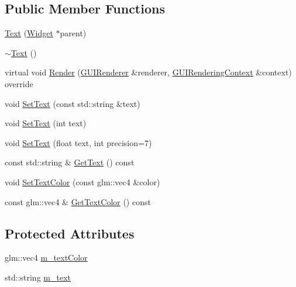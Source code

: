 \subsection*{Public Member Functions}
\begin{DoxyCompactItemize}
\item 
\mbox{\hyperlink{classngl__gui_1_1_text_aef88dfbef08883a239cafcb418367564}{Text}} (\mbox{\hyperlink{classngl__gui_1_1_widget}{Widget}} $\ast$parent)
\item 
\mbox{\hyperlink{classngl__gui_1_1_text_a844f8f7ab019695c03e3a4d834394c51}{$\sim$\+Text}} ()
\item 
virtual void \mbox{\hyperlink{classngl__gui_1_1_text_aa2dbe996a42ec05d5027ff972028ddf4}{Render}} (\mbox{\hyperlink{classngl__gui_1_1_g_u_i_renderer}{G\+U\+I\+Renderer}} \&renderer, \mbox{\hyperlink{classngl__gui_1_1_g_u_i_rendering_context}{G\+U\+I\+Rendering\+Context}} \&context) override
\item 
void \mbox{\hyperlink{classngl__gui_1_1_text_a1b0f380ffc9f3a662a10f66555e18762}{Set\+Text}} (const std\+::string \&text)
\item 
void \mbox{\hyperlink{classngl__gui_1_1_text_af359415192988ac80b0aad216eaeb661}{Set\+Text}} (int text)
\item 
void \mbox{\hyperlink{classngl__gui_1_1_text_a0e1b2e9696c84cfd54d8141809bdc032}{Set\+Text}} (float text, int precision=7)
\item 
const std\+::string \& \mbox{\hyperlink{classngl__gui_1_1_text_ab31e4a3d86b1b00122cf831c53cfe456}{Get\+Text}} () const
\item 
void \mbox{\hyperlink{classngl__gui_1_1_text_a25b6ad0a6f6b678c0851bed62479d571}{Set\+Text\+Color}} (const glm\+::vec4 \&color)
\item 
const glm\+::vec4 \& \mbox{\hyperlink{classngl__gui_1_1_text_a3836a75915b29cb21b0471e4cd589fb3}{Get\+Text\+Color}} () const
\end{DoxyCompactItemize}
\subsection*{Protected Attributes}
\begin{DoxyCompactItemize}
\item 
glm\+::vec4 \mbox{\hyperlink{classngl__gui_1_1_text_a5af39c39464b4528cf8c38edea008daf}{m\+\_\+text\+Color}}
\item 
std\+::string \mbox{\hyperlink{classngl__gui_1_1_text_a6a790da1212181a8dd95d6c5152a1699}{m\+\_\+text}}
\end{DoxyCompactItemize}
